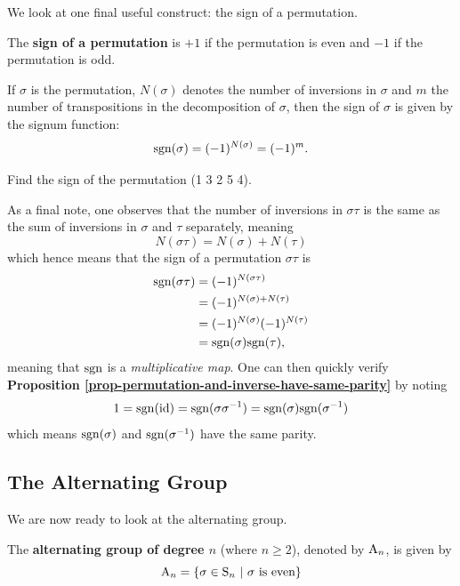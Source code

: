 We look at one final useful construct: the sign of a permutation.
\begin{definition}
    The \textbf{sign of a permutation} is $+1$ if the permutation is even and $-1$ if the permutation is odd.
\end{definition}
If $\sigma$ is the permutation, $N(\sigma)$ denotes the number of inversions in $\sigma$ and $m$ the number of transpositions in the decomposition of $\sigma$, then the sign of $\sigma$ is given by the signum function:
\[
    \mathrm{sgn}(\sigma) = (-1)^{N(\sigma)} = (-1)^m.
\]
\begin{exercise}
    Find the sign of the permutation (1 3 2 5 4).
\end{exercise}

As a final note, one observes that the number of inversions in $\sigma\tau$ is the same as the sum of inversions in $\sigma$ and $\tau$ separately, meaning
\[
    N(\sigma\tau) = N(\sigma) + N(\tau)
\]
which hence means that the sign of a permutation $\sigma\tau$ is
\begin{align*}
    \mathrm{sgn}(\sigma\tau) &= (-1)^{N(\sigma\tau)}\\
    &= (-1)^{N(\sigma) + N(\tau)}\\
    &= (-1)^{N(\sigma)}(-1)^{N(\tau)}\\
    &= \mathrm{sgn}(\sigma)\mathrm{sgn}(\tau),
\end{align*}
meaning that $\mathrm{sgn}$ is a \textit{multiplicative map}. One can then quickly verify \textbf{Proposition \ref{prop-permutation-and-inverse-have-same-parity}} by noting
\[
    1 = \mathrm{sgn}(\mathrm{id}) = \mathrm{sgn}(\sigma\sigma^{-1}) = \mathrm{sgn}(\sigma)\mathrm{sgn}(\sigma^{-1})
\]
which means $\mathrm{sgn}(\sigma)$ and $\mathrm{sgn}(\sigma^{-1})$ have the same parity.

\newpage

\subsection{The Alternating Group}
We are now ready to look at the alternating group.
\begin{definition}
    The \textbf{alternating group of degree $n$} (where $n \geq 2$), denoted by $\mathrm{A}_{n}$, is given by
    \[
        \mathrm{A}_{n} = \left\{\sigma \in \mathrm{S}_{n} \ | \ \sigma \text{ is even}\right\}
    \]
\end{definition}

